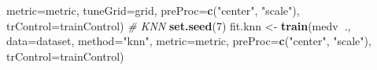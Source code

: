 \documentclass[]{book}
\newenvironment{Shaded}{\begin{snugshade}}{\end{snugshade}}
\newcommand{\CommentTok}[1]{\textcolor[rgb]{0.56,0.35,0.01}{\textit{#1}}}
\newcommand{\DataTypeTok}[1]{\textcolor[rgb]{0.13,0.29,0.53}{#1}}
\newcommand{\DecValTok}[1]{\textcolor[rgb]{0.00,0.00,0.81}{#1}}
\newcommand{\KeywordTok}[1]{\textcolor[rgb]{0.13,0.29,0.53}{\textbf{#1}}}
\newcommand{\NormalTok}[1]{#1}
\newcommand{\OperatorTok}[1]{\textcolor[rgb]{0.81,0.36,0.00}{\textbf{#1}}}
\newcommand{\StringTok}[1]{\textcolor[rgb]{0.31,0.60,0.02}{#1}}
\begin{document}
\begin{Shaded}
\begin{Highlighting}[]
                  \DataTypeTok{metric=}\NormalTok{metric, }\DataTypeTok{tuneGrid=}\NormalTok{grid, }
                  \DataTypeTok{preProc=}\KeywordTok{c}\NormalTok{(}\StringTok{"center"}\NormalTok{, }\StringTok{"scale"}\NormalTok{), }
                  \DataTypeTok{trControl=}\NormalTok{trainControl)}
\CommentTok{# KNN}
\KeywordTok{set.seed}\NormalTok{(}\DecValTok{7}\NormalTok{)}
\NormalTok{fit.knn <-}\StringTok{ }\KeywordTok{train}\NormalTok{(medv}\OperatorTok{~}\NormalTok{., }\DataTypeTok{data=}\NormalTok{dataset, }\DataTypeTok{method=}\StringTok{"knn"}\NormalTok{, }
                 \DataTypeTok{metric=}\NormalTok{metric, }\DataTypeTok{preProc=}\KeywordTok{c}\NormalTok{(}\StringTok{"center"}\NormalTok{, }\StringTok{"scale"}\NormalTok{), }
                 \DataTypeTok{trControl=}\NormalTok{trainControl)}
\end{Highlighting}
\end{Shaded}
\end{document}
